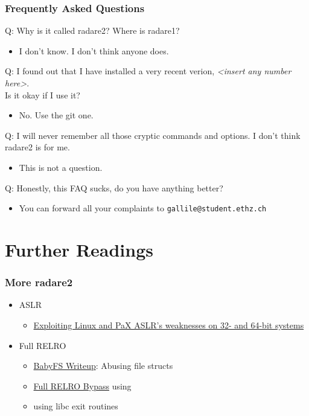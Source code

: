 \documentclass[aspectratio=169]{beamer}
\begin{document}
\begin{frame}[fragile]
    \frametitle{Frequently Asked Questions}
	Q: Why is it called radare2? Where is radare1?
	\begin{itemize}
		\item I don't know. I don't think anyone does.
    \end{itemize}

	Q: I found out that I have installed a very recent verion, \textit{\textless insert any number here\textgreater}.\\
	Is it okay if I use it?
	\begin{itemize}
		\item No. Use the git one.
	\end{itemize}
	Q: I will never remember all those cryptic commands and options. I don't think radare2 is for me.
	\begin{itemize}
		\item This is not a question.
	\end{itemize}
	
	Q: Honestly, this FAQ sucks, do you have anything better?
	\begin{itemize}
		\item You can forward all your complaints to \texttt{gallile@student.ethz.ch}
	\end{itemize}
\end{frame}

\section{Further Readings}

\begin{frame}[fragile]
    \frametitle{More radare2}
    \begin{itemize}
        \item ASLR
        \begin{itemize}
            \item \href{https://www.blackhat.com/docs/asia-16/materials/asia-16-Marco-Gisbert-Exploiting-Linux-And-PaX-ASLRS-Weaknesses-On-32-And-64-Bit-Systems-wp.pdf}{Exploiting Linux and PaX ASLR’s weaknesses on 32- and 64-bit systems}
        \end{itemize}
        \item Full RELRO
        \begin{itemize}
            \item \href{https://atum.li/2017/11/08/babyfs/}{BabyFS Writeup}: Abusing file structs 
            \item \href{https://made0x78.com/bseries-fullrelro/}{Full RELRO Bypass} using 
            \item \href{}{} using libc exit routines
        \end{itemize}
    \end{itemize}
\end{frame}
\end{document}
